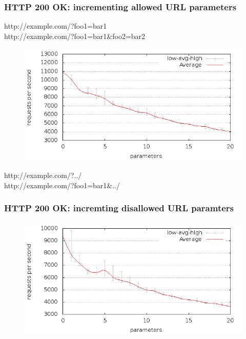 \begin{frame}
  \frametitle{HTTP 200 OK: incrementing allowed URL parameters}

  \mbox{http://example.com/?foo1=bar1}\\
  \mbox{http://example.com/?foo1=bar1\&foo2=bar2}

  \begin{figure}[H]
  \centering
  \includegraphics[scale=0.5] {../paper/images/results/200_with_naxsi_incremented_allowed_parameters/output.png}
  \end{figure}
\end{frame}

\begin{frame}
  \mbox{http://example.com/?../}\\
  \mbox{http://example.com/?foo1=bar1\&../}

  \frametitle{HTTP 200 OK: incremting disallowed URL paramters}
  \begin{figure}[H]
  \centering
  \includegraphics[scale=0.5] {../paper/images/results/200_with_naxsi_incremented_disallowed_parameters/output.png}
  \end{figure}
\end{frame}

